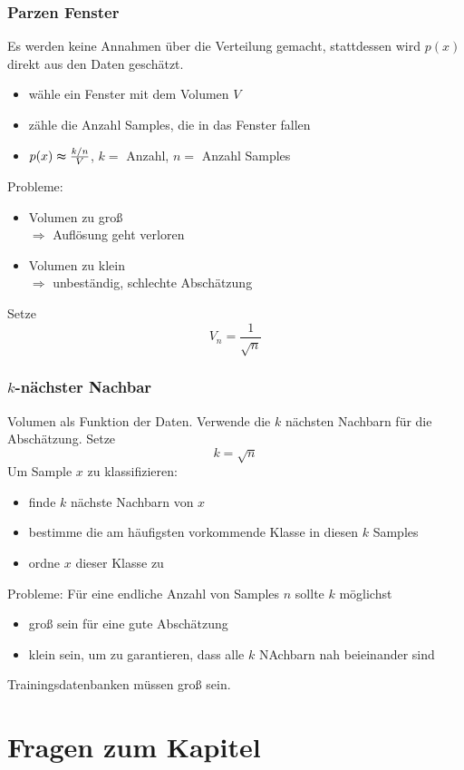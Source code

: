 \subsubsection*{Parzen Fenster}

Es werden keine Annahmen über die Verteilung gemacht, stattdessen wird $p(x)$ direkt aus den Daten geschätzt.
\begin{itemize}
\item wähle ein Fenster mit dem Volumen $V$
\item zähle die Anzahl Samples, die in das Fenster fallen
\item $p(x) \thickapprox \frac{k/n}{V}$, $k = $ Anzahl, $n = $ Anzahl Samples
\end{itemize}
Probleme:
\begin{itemize}
\item Volumen zu groß \\ $\Rightarrow$ Auflösung geht verloren
\item Volumen zu klein \\ $\Rightarrow$ unbeständig, schlechte Abschätzung
\end{itemize}
Setze $$V_n = \frac{1}{\sqrt{n}}$$

\subsubsection*{$k$-nächster Nachbar}

Volumen als Funktion der Daten. Verwende die $k$ nächsten Nachbarn für die Abschätzung. Setze $$k = \sqrt{n}$$ Um Sample $x$ zu klassifizieren:
\begin{itemize}
\item finde $k$ nächste Nachbarn von $x$
\item bestimme die am häufigsten vorkommende Klasse in diesen $k$ Samples
\item ordne $x$ dieser Klasse zu
\end{itemize}
Probleme: Für eine endliche Anzahl von Samples $n$ sollte $k$ möglichst
\begin{itemize}
\item groß sein für eine gute Abschätzung
\item klein sein, um zu garantieren, dass alle $k$ NAchbarn nah beieinander sind
\end{itemize}
Trainingsdatenbanken müssen groß sein.

\section{Fragen zum Kapitel}




